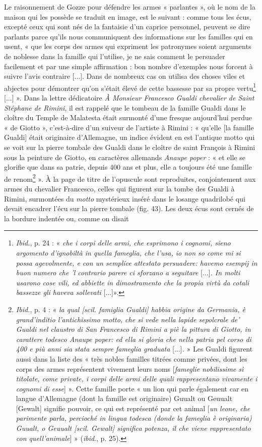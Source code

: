 \documentclass[12pt,twoside,openany]{book}
\begin{document}
Le raisonnement de Gozze pour défendre les armes « parlantes », où le nom de la maison qui les possède se traduit en image, est le suivant : comme tous les écus, excepté ceux qui sont nés de la fantaisie d’un caprice personnel, peuvent se dire parlants parce qu’ils nous communiquent des informations sur les familles qui en usent, « que les corps des armes qui expriment les patronymes soient arguments de noblesse dans la famille qui l’utilise, je ne sais comment le persuader facilement et par une simple affirmation : bon nombre d’exemples nous forcent à suivre l’avis contraire [...]. Dans de nombreux cas on utilisa des choses viles et abjectes pour démontrer qu’on s’était élevé de cette bassesse par sa propre vertu\footnote{\textit{Ibid.}, p. 24 : « \textit{che i corpi delle armi, che esprimono i cognomi, sieno argomento d’ignobiltà in quella fameglia, che l’usa, io non so come mi si possa agevolmente, e con un semplice attestato persuadere: havemo esempij in buon numero che ’l contrario parere ci sforzano a seguitare }[...]\textit{. In molti usarono cose vili, ed abbiette in dimostramento che la propia virtù da cotali bassezze gli haveva sollevati }[...]».} [...] ». Dans la lettre dédicatoire \textit{À Monsieur Francesco Gualdi chevalier de Saint Stéphane de Rimini}, il est rappelé que le tombeau de la famille Gualdi dans le cloître du Temple de Malatesta était surmonté d’une fresque aujourd’hui perdue « de Giotto », c’est-à-dire d’un suiveur de l’artiste à Rimini : « qu’elle [la famille Gualdi] était originaire d’Allemagne, un indice évident en est l’antique motto qui se voit sur la pierre tombale des Gualdi dans le cloître de saint François à Rimini sous la peinture de Giotto, en caractères allemands \textit{Anaupe poper} : « et elle se glorifie que dans sa patrie, depuis 400 ans et plus, elle a toujours été une famille de renom\footnote{\textit{Ibid.}, p. 4 : « \textit{la qual [scil. famiglia Gualdi] habbia origine da Germania, è grand’inditio l’antichissimo motto, che si vede nella lapide sepolcrale de’ Gualdi nel claustro di San Francesco di Rimini a piè la pittura di Giotto, in carattere todesco Anaupe poper: ed ella si gloria che nella patria pel corso di 400 e più anni sia stata sempre fameglia graduata }[...]\textit{. }» Les Gualdi figurent aussi dans la liste des « très nobles familles titrées comme privées, dont les corps des armes représentent vivement leurs noms [\textit{fameglie nobilissime sì titolate, come private, i corpi delle armi delle quali rappresentano vivamente i cognomi di esse}] ». Cette famille porte « un lion qui parle également car en langue d’Allemagne (dont la famille est originaire) Guualt ou Geuualt [Gewalt] signifie pouvoir, ce qui est représenté par cet animal [\textit{un leone, che parimente parla, percioché in lingua todesca (donde la fameglia è originaria) Guualt, o Geuualt [scil. Gewalt] significa potenza, il che viene rappresentato con quell’animale}] » (\textit{ibid}., p. 25).} ». À la page de titre de l’opuscule sont reproduites, conjointement aux armes du chevalier Francesco, celles qui figurent sur la tombe des Gualdi à Rimini, surmontées du \textit{motto} mystérieux inséré dans le losange quadrilobé qui devait encadrer l’écu sur la pierre tombale (fig. 43). Les deux écus sont cernés de la bordure indentée ou, comme on disait 
\end{document}
